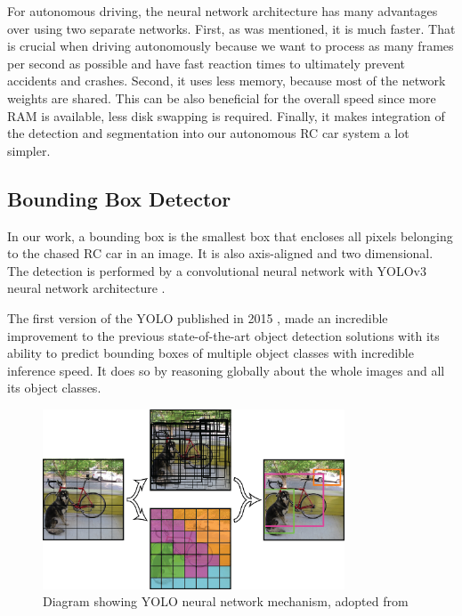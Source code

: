 For autonomous driving, the neural network architecture has many advantages over using two separate networks. First, as was mentioned, it is much faster. That is crucial when driving autonomously because we want to process as many frames per second as possible and have fast reaction times to ultimately prevent accidents and crashes. Second, it uses less memory, because most of the network weights are shared. This can be also beneficial for the overall speed since more RAM is available, less disk swapping is required. Finally, it makes integration of the detection and segmentation into our autonomous RC car system a lot simpler.




\subsection{Bounding Box Detector}
In our work, a bounding box is the smallest box that encloses all pixels belonging to the chased RC car in an image. It is also axis-aligned and two dimensional. The detection is performed by a convolutional neural network \cite{CNN_Lecun} with YOLOv3 neural network architecture \cite{YOLOv3}. \par 
The first version of the YOLO published in 2015 \cite{YOLO}, made an incredible improvement to the previous state-of-the-art object detection solutions with its ability to predict bounding boxes of multiple object classes with incredible inference speed. It does so by reasoning globally about the whole images and all its object classes. \par


\begin{figure}[h!]
    \centering
    \includegraphics[width=0.8\textwidth]{images/YOLO.png}
    
    \caption{Diagram showing YOLO neural network mechanism, adopted from \protect\cite{YOLO}}\label{f:YOLO}
\end{figure}

